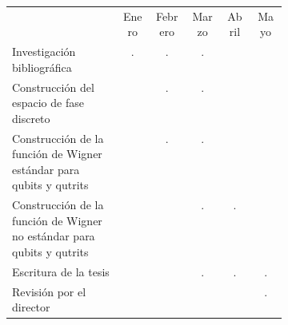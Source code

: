 \documentclass[a4paper]{article}
\begin{document}
  \begin{table}[ht]
    \centering
    \begin{tabular}{p{0.4\linewidth}ccccc}\toprule
       & Enero & Febrero & Marzo & Abril & Mayo \\
      Investigación bibliográfica & . & . & . & & \\
      \addlinespace
      Construcción del espacio de fase discreto & & . & . &
                                                & \\
      \addlinespace
      Construcción de la función de Wigner estándar para
      qubits y qutrits & & . & . & & \\
      \addlinespace
      Construcción de la función de Wigner no estándar para
      qubits y qutrits & & & . & . & \\
      \addlinespace
      Escritura de la tesis & & & . & . & . \\
      \addlinespace
      Revisión por el director & & & & & .
    \end{tabular}
  \end{table}

  \printbibliography
  
\end{document}
